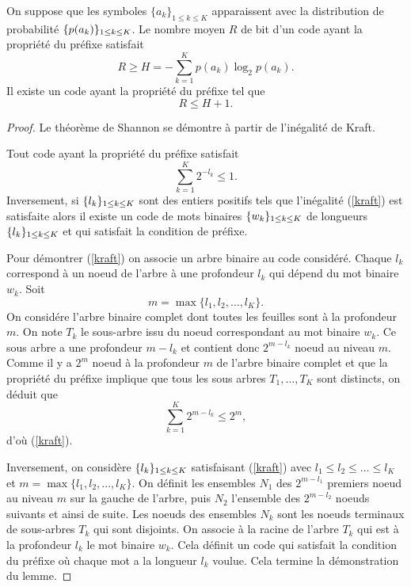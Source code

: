 \begin{theorem} [Shannon]
\label{shan-th}
On suppose que les symboles
$\{a_k\}_{1 \leq k \leq K}$ apparaissent avec la distribution
de probabilit\'e $\{p(a_k)\}_{ 1 \leq k \leq K}$.
Le nombre moyen $R$ de bit d'un code ayant la propri\'et\'e du
pr\'efixe satisfait
\begin{equation}
\label{shan1}
R \geq H = - \sum_{k=1}^K p(a_k) \log_2 p(a_k) .
\end{equation}
Il existe un code ayant la propri\'et\'e du pr\'efixe tel que
\begin{equation}
\label{shan2}
R \leq H + 1.
\end{equation}
\end{theorem}
\begin{proof}
Le th\'eor\`eme de Shannon se d\'emontre \`a partir de
l'in\'egalit\'e de Kraft.

\begin{lemma} 
Tout code ayant la propri\'et\'e du pr\'efixe satisfait
\begin{equation}
\label{kraft}
\sum_{k=1}^K 2^{-l_k} \leq 1 .
\end{equation}
Inversement, si
$\{ l_k \}_{ 1 \leq k \leq K}$ sont des entiers positifs tels que
l'in\'egalit\'e (\ref{kraft}) est satisfaite alors il existe
un code de mots binaires $\{w_k \}_{ 1 \leq k \leq K}$ de longueurs
$\{ l_k \}_{ 1 \leq k \leq K}$ et qui satisfait la condition de pr\'efixe.
\end{lemma}

Pour d\'emontrer (\ref{kraft}) on associe un arbre binaire
au code consid\'er\'e. Chaque $l_k$ correspond \`a un noeud
de l'arbre \`a une profondeur $l_k$ qui d\'epend du mot
binaire $w_k$. Soit
\begin{equation}
\label{mmax}
m = \max \{l_1, l_2, \dots , l_K\} .
\end{equation}
On consid\'ere l'arbre binaire complet dont toutes les
feuilles sont \`a la profondeur $m$.
On note $T_k$ le sous-arbre issu du noeud correspondant au
mot binaire $w_k$. Ce sous arbre a une profondeur ${m - l_k}$
et contient donc $2^{m - l_k}$ noeud au niveau $m$.
Comme il y a $2^m$ noeud \`a la profondeur $m$ de l'arbre binaire
complet et que
la propri\'et\'e du pr\'efixe implique
que tous les sous arbres $T_1 , \dots , T_K$ sont distincts, on
d\'eduit que
\[
\sum_{k=1}^K 2^{m-l_k} \leq 2^m ,
\]
d'o\`u (\ref{kraft}).



Inversement, on consid\`ere $\{ l_k \}_{ 1 \leq k \leq K}$ satisfaisant
(\ref{kraft}) avec $l_1 \leq l_2 \leq \dots \leq l_K$ et
$m = \max \{l_1, l_2, \dots , l_K\}$.
On d\'efinit les ensembles $N_1$ des $2^{m-l_1}$ premiers
noeud au niveau $m$ sur la gauche de l'arbre, puis $N_2$
l'ensemble des $2^{m-l_2}$ noeuds suivants et ainsi de suite.
Les noeuds des ensembles $N_k$ sont les noeuds terminaux
de sous-arbres $T_k$ qui sont disjoints. On associe
\`a la racine de l'arbre $T_k$ qui est \`a la profondeur
$l_k$ le mot binaire $w_k$. Cela d\'efinit un code
qui satisfait la condition du pr\'efixe o\`u chaque
mot a la longueur $l_k$ voulue.
Cela termine la d\'emonstration du lemme.


\end{proof}
